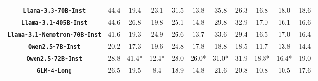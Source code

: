 \begin{table*}[t]
\begin{tabular}{c|ccc|ccc|ccc|c}
		\textbf{\texttt{Llama-3.3-70B-Inst}}& \multicolumn{1}{c}{44.4}                  & \multicolumn{1}{c}{19.4}               &      23.1            & \multicolumn{1}{c}{31.5}                  & \multicolumn{1}{c}{13.8}               &       35.8           & \multicolumn{1}{c}{26.3}                  & \multicolumn{1}{c}{16.8}               &   18.0               &     18.6              \\  
		
		\textbf{\texttt{Llama-3.1-405B-Inst}}& \multicolumn{1}{c}{44.6}                  & \multicolumn{1}{c}{26.8}               &          19.8        & \multicolumn{1}{c}{25.1}                  & \multicolumn{1}{c}{14.8}               &     29.8             & \multicolumn{1}{c}{32.9}                  & \multicolumn{1}{c}{17.0}               &    16.1              &     16.6              \\  
		
		\textbf{\texttt{Llama-3.1-Nemotron-70B-Inst}}& \multicolumn{1}{c}{41.6}                  & \multicolumn{1}{c}{19.3}               &        24.9          & \multicolumn{1}{c}{26.6}                  & \multicolumn{1}{c}{13.7}               &      33.6            & \multicolumn{1}{c}{29.4}                  & \multicolumn{1}{c}{16.5}               &     17.0             &     16.4              \\  
		
		\textbf{\texttt{Qwen2.5-7B-Inst}}& \multicolumn{1}{c}{20.2}                  & \multicolumn{1}{c}{17.3}               &    19.6              & \multicolumn{1}{c}{24.8}                  & \multicolumn{1}{c}{17.8}               &      18.8            & \multicolumn{1}{c}{18.5}                  & \multicolumn{1}{c}{11.7}               &     13.8             &    14.4               \\  
		\textbf{\texttt{Qwen2.5-72B-Inst}}& \multicolumn{1}{c}{28.8}                  & \multicolumn{1}{c}{41.4*}               &       12.4*           & \multicolumn{1}{c}{28.0}                  & \multicolumn{1}{c}{26.0*}               &       31.0*           & \multicolumn{1}{c}{31.9}                  & \multicolumn{1}{c}{18.8*}               &        16.4*          &      19.0             \\  
		\textbf{\texttt{GLM-4-Long}}& \multicolumn{1}{c}{26.5}                  & \multicolumn{1}{c}{19.5}               &       8.4           & \multicolumn{1}{c}{18.9}                  & \multicolumn{1}{c}{14.8}               &      21.6            & \multicolumn{1}{c}{20.8}                  & \multicolumn{1}{c}{10.8 }               &      10.5            &        17.6           \\  
		

\end{tabular}
\end{table*}
